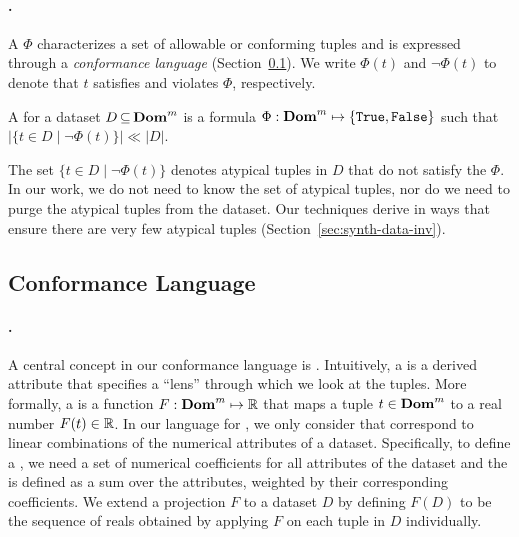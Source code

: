 \smallskip

 \paragraph{\Di.} A \di $\Phi$ characterizes a set of allowable or
conforming tuples and is expressed through a \emph{conformance language}
(Section~\ref{sec:cl}). We write $\Phi(t)$ and $\neg\Phi(t)$ to denote that $t$
satisfies and violates $\Phi$, respectively.

\begin{definition}[\Di]\label{def:di2}
     A \di for a dataset $D \,{\subseteq}\, {\mathbf{Dom}}^m$ is a formula
     $\Phi: {\mathbf{Dom}}^m \mapsto \{{\mathtt{True}},{\mathtt{False}}\}$ such that $|\{t \in D \mid
     \neg\Phi(t)\}| \ll |D|$.
\end{definition}
% 
The set $\{t \in D \mid \neg\Phi(t)\}$ denotes atypical tuples in $D$ that do
not satisfy the \di $\Phi$. In our work, we do not need to know the set of
atypical tuples, nor do we need to purge the atypical tuples from the dataset.
Our techniques derive \invariants in ways that ensure there are very few
atypical tuples (Section~\ref{sec:synth-data-inv}). 


\subsection{Conformance Language}\label{sec:cl}
%
 \paragraph{\View.} A central concept in our conformance language
is \linebreak \emph{\view}. Intuitively, a \view is a derived attribute that
specifies a ``lens'' through which we look at the tuples. More formally, a
\view is a function $F: \mathbf{Dom}^m \mapsto{\mathbb{R}}$ that maps a tuple $t\in\mathbf{Dom}^m$
to a real number $F(t) \in {\mathbb{R}}$. In our language for \dis, we only consider
\views that correspond to linear combinations of the numerical attributes of a
dataset. Specifically, to define a \view, we need a set of numerical
coefficients for all attributes of the dataset and the \view is defined as a
sum over the attributes, weighted by their corresponding coefficients. We extend
a projection $F$ to a dataset $D$ by defining $F(D)$ to be the sequence of
reals obtained by applying $F$ on each tuple in $D$ individually.

\smallskip

